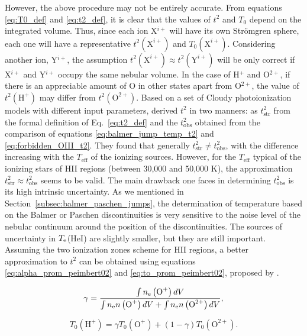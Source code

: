 \documentclass[fleqn,usenatbib]{mnras}
\begin{document}
However, the above procedure may not be entirely accurate. From equations \eqref{eq:T0_def} and \eqref{eq:t2_def}, it is clear that the values of $t^2$ and $T_0$ depend on the integrated volume. Thus, since each ion X$^{i+}$ will have its own Str\"omgren sphere, each one will have a representative $t^2(\text{X}^{i+})$ and $T_0 (\text{X}^{i+})$. Considering another ion, Y$^{i+}$, the assumption $t^2(\text{X}^{i+}) \approx t^2(\text{Y}^{i+})$ will be only correct if X$^{i+}$ and Y$^{i+}$ occupy the same nebular volume. In the case of H$^{+}$ and O$^{2+}$, if there is an appreciable amount of O in other states apart from O$^{2+}$, the value of $t^{2}(\text{H}^{+})$ may differ from $t^{2}(\text{O}^{2+})$. 
Based on a set of Cloudy photoionization models with different input parameters, \citet{kingdon95} derived $t^2$ in two manners: as $t^2_{\text{str}}$ from the formal definition of Eq.~\eqref{eq:t2_def} and the $t^2_{\text{obs}}$ obtained from the comparison of equations \eqref{eq:balmer_jump_temp_t2} and \eqref{eq:forbidden_OIII_t2}. They found that generally $t^2_{\text{str}} \neq t^2_{\text{obs}}$, with the difference increasing with the $T_{\text{eff}}$ of the ionizing sources. However, for the $T_{\text{eff}}$ typical of the ionizing stars of H\thinspace II regions (between 30,000 and 50,000 K), the approximation $t^2_{\text{str}} \approx t^2_{\text{obs}}$ seems to be valid. The main drawback one faces in determining $t^2_{\text{obs}}$ is its high intrinsic uncertainty. As we mentioned in Section~\ref{subsec:balmer_paschen_jumps}, the determination of temperature based on the Balmer or Paschen discontinuities is very sensitive to the noise level of the nebular continuum around the position of the discontinuities.  The sources of uncertainty in $T_{\rm e}$(\mbox{He}\thinspace \mbox{I}) are slightly smaller, but they are still important. Assuming the two ionization zones scheme for H\thinspace II regions, a better approximation to $t^2$ can be obtained using  equations \eqref{eq:alpha_prom_peimbert02} and \eqref{eq:to_prom_peimbert02}, proposed by \citet{peimbert02}. 


\begin{equation}
\label{eq:alpha_prom_peimbert02}
\gamma=\frac{\int n_{\rm e}\left(\text{O}^{+}\right)dV}{\int n_{\rm e} n\left(\text{O}^{+}\right)dV+\int n_{\rm e} n\left(\text{O}^{2+}\right)dV},
\end{equation}{}

\begin{equation}
\label{eq:to_prom_peimbert02}
    T_0(\text{H}^{+})=\gamma T_0(\text{O}^{+})+ \left(1-\gamma\right)T_0(\text{O}^{2+}).
\end{equation}{}
\end{document}

